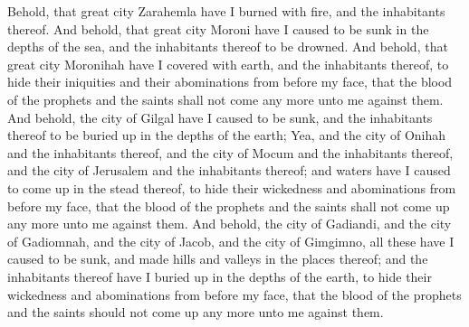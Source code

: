 Behold, that great city Zarahemla have I burned with fire, and the inhabitants thereof.
\bverse \iffalse And behold, that great city Moroni have I caused to be sunk in the depths of the sea, and the inhabitants thereof to be drowned. \fi
And behold, that great city Moroni have I caused to be sunk in the depths of the sea, and the inhabitants thereof to be drowned.
\bverse \iffalse And behold, that great city Moronihah have I covered with earth, and the inhabitants thereof, to hide their iniquities and their abominations from before my face, that the blood of the prophets and the saints shall not come any more unto me against them. \fi
And behold, that great city Moronihah have I covered with earth, and the inhabitants thereof, to hide their iniquities and their abominations from before my face, that the blood of the prophets and the saints shall not come any more unto me against them.
\bverse \iffalse And behold, the city of Gilgal have I caused to be sunk, and the inhabitants thereof to be buried up in the depths of the earth; \fi
And behold, the city of Gilgal have I caused to be sunk, and the inhabitants thereof to be buried up in the depths of the earth;
\bverse \iffalse Yea, and the city of Onihah and the inhabitants thereof, and the city of Mocum and the inhabitants thereof, and the city of Jerusalem and the inhabitants thereof; and waters have I caused to come up in the stead thereof, to hide their wickedness and abominations from before my face, that the blood of the prophets and the saints shall not come up any more unto me against them. \fi
Yea, and the city of Onihah and the inhabitants thereof, and the city of Mocum and the inhabitants thereof, and the city of Jerusalem and the inhabitants thereof; and waters have I caused to come up in the stead thereof, to hide their wickedness and abominations from before my face, that the blood of the prophets and the saints shall not come up any more unto me against them.
\bverse \iffalse And behold, the city of Gadiandi, and the city of Gadiomnah, and the city of Jacob, and the city of Gimgimno, all these have I caused to be sunk, and made hills and valleys in the places thereof; and the inhabitants thereof have I buried up in the depths of the earth, to hide their wickedness and abominations from before my face, that the blood of the prophets and the saints should not come up any more unto me against them. \fi
And behold, the city of Gadiandi, and the city of Gadiomnah, and the city of Jacob, and the city of Gimgimno, all these have I caused to be sunk, and made hills and valleys in the places thereof; and the inhabitants thereof have I buried up in the depths of the earth, to hide their wickedness and abominations from before my face, that the blood of the prophets and the saints should not come up any more unto me against them.
